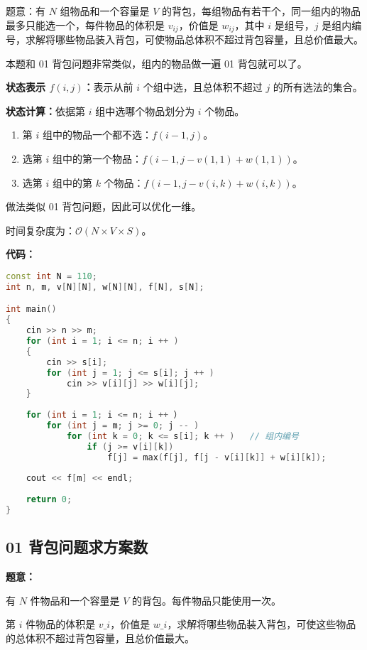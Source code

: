 题意：有 $N$ 组物品和一个容量是 $V$ 的背包，每组物品有若干个，同一组内的物品最多只能选一个，每件物品的体积是 $v_{ij}$，价值是 $w_{ij}$，其中 $i$ 是组号，$j$ 是组内编号，求解将哪些物品装入背包，可使物品总体积不超过背包容量，且总价值最大。

本题和 01 背包问题非常类似，组内的物品做一遍 01 背包就可以了。

\textbf{状态表示 $f(i, j)$：}表示从前 $i$ 个组中选，且总体积不超过 $j$ 的所有选法的集合。

\textbf{状态计算：}依据第 $i$ 组中选哪个物品划分为 $i$ 个物品。

\begin{enumerate}
\item 第 $i$ 组中的物品一个都不选：$f(i - 1, j)$。
\item 选第 $i$ 组中的第一个物品：$f(i - 1, j - v(1, 1) + w(1, 1))$。
\item 选第 $i$ 组中的第 $k$ 个物品：$f(i - 1, j - v(i, k) + w(i, k))$。
\end{enumerate}

做法类似 01 背包问题，因此可以优化一维。

时间复杂度为：$\mathcal{O}(N \times V \times S)$。

\textbf{代码：}

\begin{lstlisting}[language=cpp]
const int N = 110;
int n, m, v[N][N], w[N][N], f[N], s[N];

int main()
{
    cin >> n >> m;
    for (int i = 1; i <= n; i ++ )
    {
        cin >> s[i];
        for (int j = 1; j <= s[i]; j ++ )
            cin >> v[i][j] >> w[i][j];
    }
    
    for (int i = 1; i <= n; i ++ ）
        for (int j = m; j >= 0; j -- )
            for (int k = 0; k <= s[i]; k ++ )   // 组内编号
                if (j >= v[i][k])
                    f[j] = max(f[j], f[j - v[i][k]] + w[i][k]);
    
    cout << f[m] << endl;
    
    return 0;
}
\end{lstlisting}

\subsection{01 背包问题求方案数}

\textbf{题意：}

有 $N$ 件物品和一个容量是 $V$ 的背包。每件物品只能使用一次。

第 $i$ 件物品的体积是 $v\_i$，价值是 $w\_i$，求解将哪些物品装入背包，可使这些物品的总体积不超过背包容量，且总价值最大。

